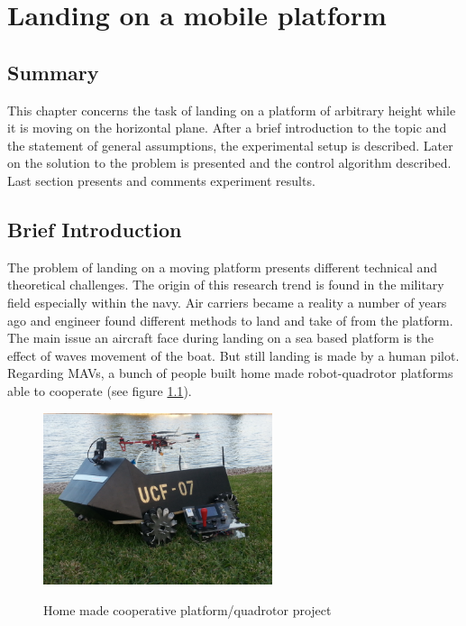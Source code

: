 
\chapter{Landing on a mobile platform}
\label{chap:seventh}
\ifpdf
    \graphicspath{{Chapter7/Figures/PNG/}{Chapter7/Figures/PDF/}{Chapter7/Figures/}}
\else
    \graphicspath{{Chapter7/Figures/EPS/}{Chapter7/Figures/}}
\fi

\section*{Summary}

This chapter concerns the task of landing on a platform of arbitrary height while it is moving on the horizontal plane. After a brief introduction to the topic and the statement of general assumptions, the experimental setup is described. Later on the solution to the problem is presented and the control algorithm described. Last section presents and comments experiment results.

\section{Brief Introduction}


The problem of landing on a moving platform presents different technical and theoretical challenges. The origin of this research trend is found in the military field especially within the navy. Air carriers became a reality a number of years ago and engineer found different methods to land and take of from the platform. The main issue an aircraft face during landing on a sea based platform is the effect of waves movement of the boat. But still landing is made by a human pilot. Regarding MAVs, a bunch of people built home made robot-quadrotor platforms able to cooperate (see figure \ref{figure:couple}).
\begin{figure}[h]
\centering
\includegraphics[width = 0.6\textwidth ]{couple.jpg}
\label{figure:couple}
\caption{Home made cooperative platform/quadrotor project}
\end{figure}

